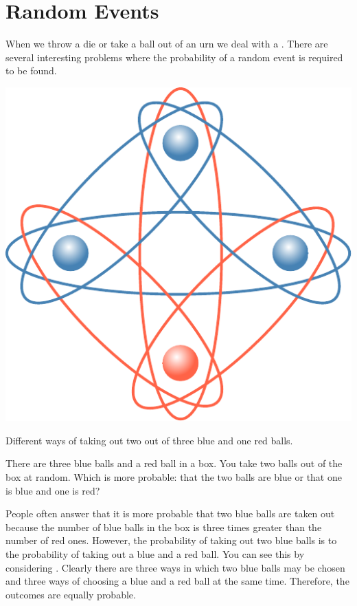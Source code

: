 \section{Random Events}

When we throw a die or take a ball out of an urn we deal with
a . There are several interesting problems where the
probability of a random event is required to be found.

\begin{marginfigure}[-1cm]%
 \centering
 \includegraphics[width=\textwidth]{figures/three-balls.pdf}
\caption{Different ways of taking out two out of three blue and one
  red balls.\label{three-balls}}
\end{marginfigure}


 There are three blue balls and a red
ball in a box. You take two balls out of the box at random. Which is
more probable: that the two balls are blue or that one is blue and one is
red?

People often answer that it is more probable that two blue balls are
taken out because the number of blue balls in the box is three times
greater than the number of red ones. However, the probability of taking
out two blue balls is  to the probability of taking out a blue and
a red ball. You can see this by considering . Clearly there are three ways in which two blue balls may be chosen and three ways of
choosing a blue and a red ball at the same time. Therefore, the
outcomes are equally probable.


